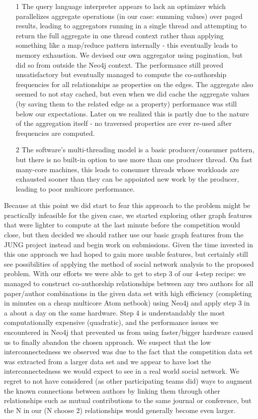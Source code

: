 \begin{enumerate}


\item[1] The query language interpreter appears to lack an optimizer which parallelizes aggregate operations (in our case: summing values) over paged results, leading to aggregators running in a single thread and attempting to return the full aggregate in one thread context rather than applying something like a map/reduce pattern internally - this eventually leads to memory exhaustion.
We devised our own aggregator using pagination, but did so from outside the Neo4j context. The performance still proved unsatisfactory but eventually managed to compute the co-authorship frequencies for all relationships as properties on the edges.
The aggregate also seemed to not stay cached, but even when we did cache the aggregate values (by saving them to the related edge as a property) performance was still below our expectations. Later on we realized this is partly due to the nature of the aggregation itself - no traversed properties are ever re-used after frequencies are computed.

\item[2] The software’s multi-threading model is a basic producer/consumer pattern, but there is no built-in option to use more than one producer thread. On fast many-core machines, this leads to consumer threads whose workloads are exhausted sooner than they can be appointed new work by the producer, leading to poor multicore performance.
\end{enumerate}
Because at this point we did start to fear this approach to the problem might be practically infeasible for the given case, we started exploring other graph features that were lighter to compute at the last minute before the competition would close, but then decided we should rather use our basic graph features from the JUNG project instead and begin work on submissions.
Given the time invested in this one approach we had hoped to gain more usable features, but certainly still see possibilities of applying the method of social network analysis to the proposed problem. With our efforts we were able to get to step 3 of our 4-step recipe: we managed to construct co-authorship relationships between any two authors for all paper/author combinations in the given data set with high efficiency (completing in minutes on a cheap multicore Atom netbook) using Neo4j and apply step 3 in a about a day on the same hardware. Step 4 is understandably the most computationally expensive (quadratic), and the performance issues we encountered in Neo4j that prevented us from using faster/bigger hardware caused us to finally abandon the chosen approach.
We suspect that the low interconnectedness we observed was due to the fact that the competition data set was extracted from a larger data set and we appear to have lost the interconnectedness we would expect to see in a real world social network.
We regret to not have considered (as other participating teams did) ways to augment the known connections between authors by linking them through other relationships such as mutual contributions to the same journal or conference, but the N in our (N choose 2) relationships would generally become even larger.
